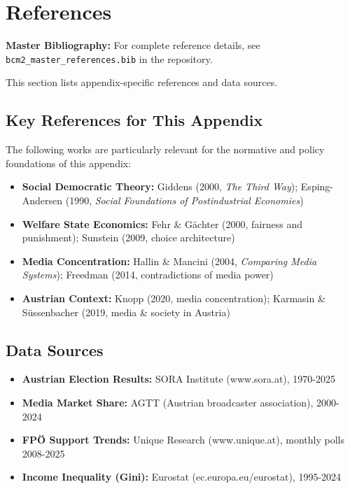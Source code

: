 
\section{References}
\label{sec:bf-references}

\begin{tcolorbox}[colback=blue!5!white, colframe=blue!75!black]
\textbf{Master Bibliography:} For complete reference details, see
\texttt{bcm2\_master\_references.bib} in the repository.

This section lists appendix-specific references and data sources.
\end{tcolorbox}

\vspace{0.5em}

\subsection{Key References for This Appendix}

The following works are particularly relevant for the normative and policy foundations of this appendix:

\begin{itemize}[nosep]
    \item \textbf{Social Democratic Theory:} Giddens (2000, \textit{The Third Way}); Esping-Andersen (1990, \textit{Social Foundations of Postindustrial Economies})
    \item \textbf{Welfare State Economics:} Fehr \& Gächter (2000, fairness and punishment); Sunstein (2009, choice architecture)
    \item \textbf{Media Concentration:} Hallin \& Mancini (2004, \textit{Comparing Media Systems}); Freedman (2014, contradictions of media power)
    \item \textbf{Austrian Context:} Knopp (2020, media concentration); Karmasin \& Süssenbacher (2019, media \& society in Austria)
\end{itemize}

\subsection{Data Sources}

\begin{itemize}[nosep]
    \item \textbf{Austrian Election Results:} SORA Institute (www.sora.at), 1970-2025
    \item \textbf{Media Market Share:} AGTT (Austrian broadcaster association), 2000-2024
    \item \textbf{FPÖ Support Trends:} Unique Research (www.unique.at), monthly polls 2008-2025
    \item \textbf{Income Inequality (Gini):} Eurostat (ec.europa.eu/eurostat), 1995-2024
\end{itemize}

